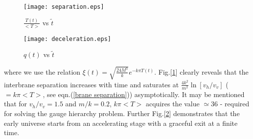 \documentclass[a4paper]{article}
\begin{document}
 \begin{figure}[!h]
\begin{center}
 \centering
 \texttt{[image: separation.eps]}
 \caption{$\frac{T(t)}{<T>}$ vs $\tilde{t}$}
 \label{plot brane separation}
\end{center}
\end{figure}

\begin{figure}[!h]
\begin{center}
 \centering
 \texttt{[image: deceleration.eps]}
 \caption{$q(t)$ vs $\tilde{t}$}
 \label{plot deceleration parameter}
\end{center}
\end{figure}
 
 where we use the relation $\xi(t)=\sqrt{\frac{24M^3}{k}}e^{-k\pi T(t)}$. Fig.[\ref{plot brane separation}] 
 clearly reveals that the interbrane separation 
 increases with time and saturates at $\frac{4k^2}{m^2}\ln{[v_h/v_v]}$ ($= k\pi<T>$, see eqn.(\ref{brane separation})) 
 asymptotically. It may be mentioned that 
 for $v_h/v_v = 1.5$ and $m/k = 0.2$, $k\pi<T>$ acquires the value $\simeq 36$ - required for solving the gauge hierarchy problem. Further 
 Fig.[\ref{plot deceleration parameter}] demonstrates that the early universe starts from an accelerating stage with a graceful 
 exit at a finite time.\\
 
\end{document}
